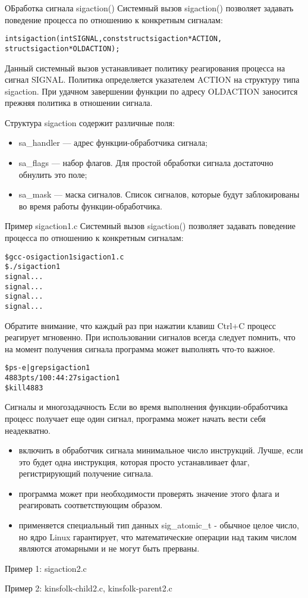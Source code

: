 \documentclass{beamer}
\begin{document}
\begin{frame}[fragile]{ОБработка сигнала sigaction()}
Системный вызов sigaction() позволяет задавать поведение процесса по отношению к конкретным сигналам:
\begin{alltt}
int sigaction (int SIGNAL, const struct sigaction * ACTION, 
  struct sigaction * OLDACTION);
\end{alltt}
Данный системный вызов устанавливает политику реагирования процесса на сигнал SIGNAL. Политика определяется указателем ACTION на структуру типа sigaction. При удачном завершении функции по адресу OLDACTION заносится прежняя политика в отношении сигнала. 

Структура sigaction содержит различные поля:
\begin{itemize}
\item sa\_handler — адрес функции-обработчика сигнала; 
\item sa\_flags — набор флагов. Для простой обработки сигнала достаточно обнулить это поле;
\item sa\_mask — маска сигналов. Список сигналов, которые будут заблокированы во время работы функции-обработчика. 
\end{itemize}
\end{frame}

\begin{frame}[fragile]{Пример sigaction1.c}
Системный вызов sigaction() позволяет задавать поведение процесса по отношению к конкретным сигналам:
\begin{alltt}
\$ gcc -o sigaction1 sigaction1.c
\$ ./sigaction1
signal...
signal...
signal...
signal...
\end{alltt}
Обратите внимание, что каждый раз при нажатии клавиш Ctrl+C процесс реагирует мгновенно. 
При использовании сигналов всегда следует помнить, что на момент получения сигнала программа может выполнять что-то важное.
\begin{alltt}
\$ ps -e | grep sigaction1
4883 pts/1 00:44:27 sigaction1
\$ kill 4883
\end{alltt}
\end{frame}

\begin{frame}[fragile]{Сигналы и многозадачность}
Если во время выполнения функции-обработчика процесс получает еще один сигнал, программа может начать вести себя неадекватно.
\begin{itemize}
\item включить в обработчик сигнала минимальное число инструкций. Лучше, если это будет
одна инструкция, которая просто устанавливает флаг, регистрирующий получение
сигнала. 
\item программа может при необходимости проверять значение этого флага и реагировать соответствующим образом.
\item применяется специальный тип данных sig\_atomic\_t - обычное целое число, но ядро Linux гарантирует, что математические операции над таким числом являются атомарными и не могут быть прерваны.
\end{itemize}
Пример 1: sigaction2.c

Пример 2: kinsfolk-child2.c, kinsfolk-parent2.c
\end{frame}
\end{document}
